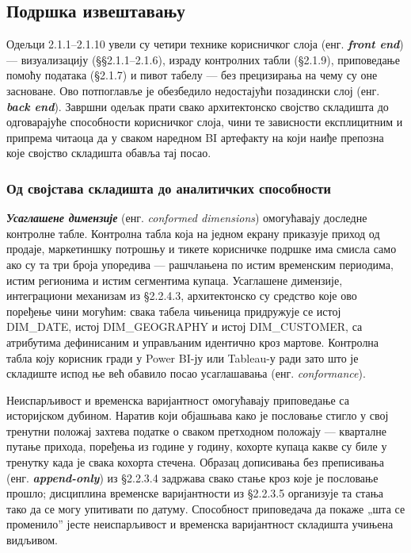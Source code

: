 \subsection{Подршка извештавању}
Одељци 2.1.1–2.1.10 увели су четири технике корисничког слоја (енг. \textbf{\textit{front end}}) — визуализацију (§§2.1.1–2.1.6), израду контролних табли (§2.1.9), приповедање помоћу података (§2.1.7) и пивот табелу — без прецизирања на чему су оне засноване. Ово потпоглавље је обезбедило недостајући позадински слој (енг. \textbf{\textit{back end}}). Завршни одељак прати свако архитектонско својство складишта до одговарајуће способности корисничког слоја, чини те зависности експлицитним и припрема читаоца да у сваком наредном BI артефакту на који наиђе препозна које својство складишта обавља тај посао.

\subsubsection{Од својстава складишта до аналитичких способности}
\textbf{\textit{Усаглашене димензије}} (енг. \textit{conformed dimensions}) омогућавају доследне контролне табле. Контролна табла која на једном екрану приказује приход од продаје, маркетиншку потрошњу и тикете корисничке подршке има смисла само ако су та три броја упоредива — рашчлањена по истим временским периодима, истим регионима и истим сегментима купаца. Усаглашене димензије, интеграциони механизам из §2.2.4.3, архитектонско су средство које ово поређење чини могућим: свака табела чињеница придружује се истој DIM\_DATE, истој DIM\_GEOGRAPHY и истој DIM\_CUSTOMER, са атрибутима дефинисаним и управљаним идентично кроз мартове. Контролна табла коју корисник гради у Power BI-ју или Tableau-у ради зато што је складиште испод ње већ обавило посао усаглашавања (енг. \textit{conformance}).

Неиспарљивост и временска варијантност омогућавају приповедање са историјском дубином. Наратив који објашњава како је пословање стигло у свој тренутни положај захтева податке о сваком претходном положају — кварталне путање прихода, поређења из године у годину, кохорте купаца какве су биле у тренутку када је свака кохорта стечена. Образац дописивања без преписивања (енг. \textbf{\textit{append-only}}) из §2.2.3.4 задржава свако стање кроз које је пословање прошло; дисциплина временске варијантности из §2.2.3.5 организује та стања тако да се могу упитивати по датуму. Способност приповедача да покаже „шта се променило” јесте неиспарљивост и временска варијантност складишта учињена видљивом.

